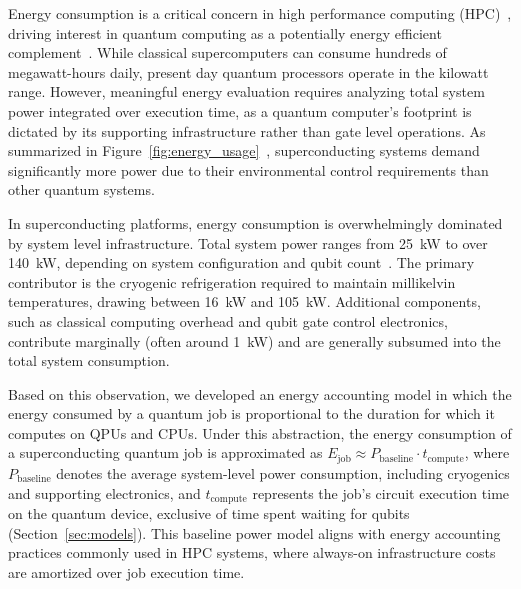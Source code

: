 Energy consumption is a critical concern in high performance computing (HPC)~\cite{Veigas2025, iea2025data_centers}, driving interest in quantum computing as a potentially energy efficient complement~\cite{martin2022energy, jaschke2023quantum}. While classical supercomputers can consume hundreds of megawatt-hours daily, present day quantum processors operate in the kilowatt range. However, meaningful energy evaluation requires analyzing total system power integrated over execution time, as a quantum computer's footprint is dictated by its supporting infrastructure rather than gate level operations. As summarized in Figure~\ref{fig:energy_usage}~\cite{ezratty2021}, superconducting systems demand significantly more power due to their environmental control requirements than other quantum systems.

In superconducting platforms, energy consumption is overwhelmingly dominated by system level infrastructure. Total system power ranges from 25~kW to over 140~kW, depending on system configuration and qubit count~\cite{ezratty2021}. The primary contributor is the cryogenic refrigeration required to maintain millikelvin temperatures, drawing between 16~kW and 105~kW. Additional components, such as classical computing overhead and qubit gate control electronics, contribute marginally (often around 1~kW) and are generally subsumed into the total system consumption.

Based on this observation, we developed an energy accounting model in which the energy consumed by a quantum job is proportional to the duration for which it computes on QPUs and CPUs. Under this abstraction, the energy consumption of a superconducting quantum job is approximated as $E_{\text{job}} \approx P_{\text{baseline}} \cdot t_{\text{compute}}$, where \(P_{\text{baseline}}\) denotes the average system-level power consumption, including cryogenics and supporting electronics, and \(t_{\text{compute}}\) represents the job's circuit execution time on the quantum device, exclusive of time spent waiting for qubits (Section~\ref{sec:models}). This baseline power model aligns with energy accounting practices commonly used in HPC systems, where always-on infrastructure costs are amortized over job execution time. 